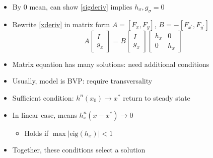 \documentclass[bigger,handout]{beamer}
\begin{document}
\begin{frame}%
 

\begin{itemize}
\item By 0 mean, can show \ref{sigderiv} implies $h_\sigma,g_\sigma=0$
\item Rewrite \ref{xderiv} in matrix form $A=\left[F_{x}, F_{y}\right]$, $B=-\left[F_{x^{\prime}}, F_{y^{\prime}}\right]$
\begin{equation} \label{systemsolve}
A \begin{bmatrix} 
I \\ 
g_x
\end{bmatrix} 
= B 
  \begin{bmatrix} 
I \\ 
g_x
\end{bmatrix} 
  \begin{bmatrix}
  h_{x} & 0 \\
   0 &   h_{x}
  \end{bmatrix}
\end{equation}
\item Matrix equation has many solutions: need additional conditions
\item Usually, model is BVP: require transversality
\item Sufficient condition: $h^{n}(x_0)\to x^{*}$ return to steady state
\item In linear case, means $h_{x}^{n}(x-x^{*})\to 0$
\begin{itemize}
\item Holds if $\max\left|\text{eig} (h_x)\right|<1$
\end{itemize}
\item Together, these conditions select a solution

\end{itemize}

\end{frame}%
\end{document}
